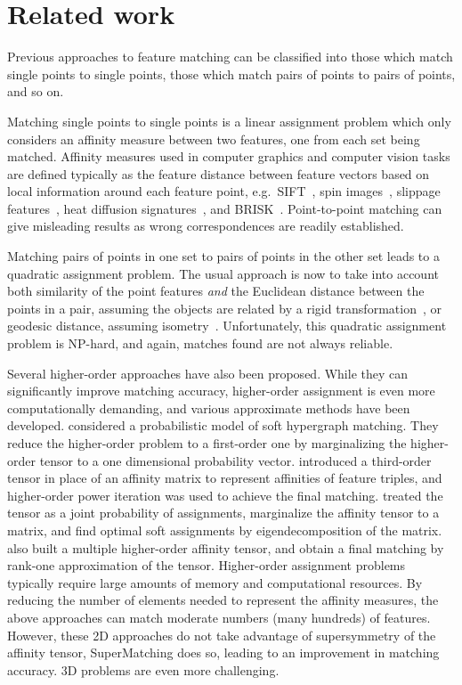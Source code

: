 \section{Related work}
\label{sec:related}

Previous approaches to feature matching can be classified into those which match single points to single points, those which match pairs of points to pairs of points, and so on.

Matching single points to single points is a linear assignment problem which only considers an affinity measure between two features, one from each set being matched.
Affinity measures used in  computer graphics and computer vision tasks are defined typically as the feature distance between feature vectors based on local information around each feature point,
e.g.\ SIFT~\cite{Lowe04}, spin images~\cite{Johnson99}, slippage features~\cite{Bokeloh08}, heat diffusion signatures~\cite{Sun09}, and BRISK~\cite{Leutenegger11}.
Point-to-point matching can give misleading results as wrong correspondences are readily established.

Matching pairs of points in one set to pairs of points in the other set leads to a quadratic assignment problem.
The usual approach is now to take into account both similarity of the point features \emph{and} the Euclidean distance between the points in a pair,
assuming the objects are related by a rigid transformation~\cite{Leordeanu05,Cour06}, or geodesic distance, assuming isometry~\cite{li08,Tevs09,Ovsjanikov10,Tevs11,SahilliogluY11,Windheuser11}.
Unfortunately, this quadratic assignment problem is NP-hard, and again, matches found are not always reliable.

Several higher-order approaches have also been proposed.
While they can significantly improve matching accuracy,
higher-order assignment  is even more computationally demanding, and various approximate methods have been developed.
\cite{Zass08} considered a probabilistic model of soft hypergraph matching.
They reduce the higher-order problem to a first-order one by marginalizing the higher-order tensor to a one dimensional probability vector.
\cite{Duchenne09} introduced a third-order tensor in place of an affinity matrix to represent affinities of feature triples,
and higher-order power iteration was used to achieve the final matching.
\cite{Chertok10} treated the tensor as a joint probability of assignments, marginalize the affinity tensor to a matrix,
and find optimal soft assignments by eigendecomposition of the matrix.
\cite{Aiping10} also built a multiple higher-order affinity tensor, and obtain a final matching by rank-one approximation of the tensor.
Higher-order assignment problems typically require large amounts of memory and computational resources. By reducing the number of elements needed to represent the affinity measures, the above approaches can match moderate numbers (many hundreds) of features. However, these 2D approaches do not take advantage of supersymmetry of the affinity tensor, SuperMatching does so, leading to an improvement in matching accuracy.
3D problems are even more challenging.

